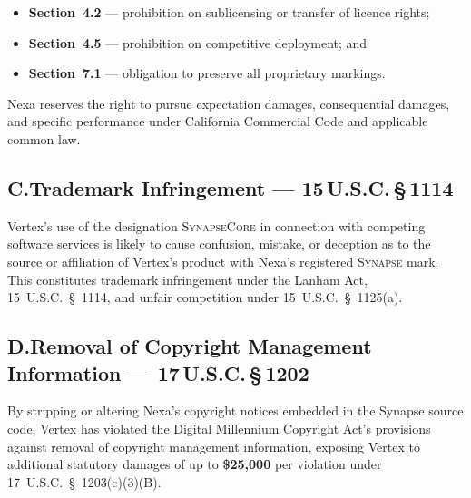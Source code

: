 \begin{itemize}[leftmargin=2em, itemsep=4pt]
  \item \textbf{Section~4.2} — prohibition on sublicensing or transfer of
        licence rights;
  \item \textbf{Section~4.5} — prohibition on competitive deployment; and
  \item \textbf{Section~7.1} — obligation to preserve all proprietary markings.
\end{itemize}

Nexa reserves the right to pursue expectation damages, consequential damages,
and specific performance under California Commercial Code and applicable
common law.

\subsection*{C.\quad Trademark Infringement — 15\,U.S.C.\,\S\,1114}

Vertex's use of the designation \textsc{SynapseCore} in connection with
competing software services is likely to cause confusion, mistake, or deception
as to the source or affiliation of Vertex's product with Nexa's registered
\textsc{Synapse} mark. This constitutes trademark infringement under the
Lanham Act, 15~U.S.C.~\S~1114, and unfair competition under 15~U.S.C.~\S~1125(a).

\subsection*{D.\quad Removal of Copyright Management Information — 17\,U.S.C.\,\S\,1202}

By stripping or altering Nexa's copyright notices embedded in the Synapse
source code, Vertex has violated the Digital Millennium Copyright Act's
provisions against removal of copyright management information, exposing
Vertex to additional statutory damages of up to \textbf{\$25,000} per
violation under 17~U.S.C.~\S~1203(c)(3)(B).

\vspace{10pt}

